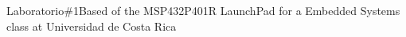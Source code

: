 Laboratorio\#1\+Based of the M\+S\+P432\+P401R Launch\+Pad for a Embedded Systems class at Universidad de Costa Rica 